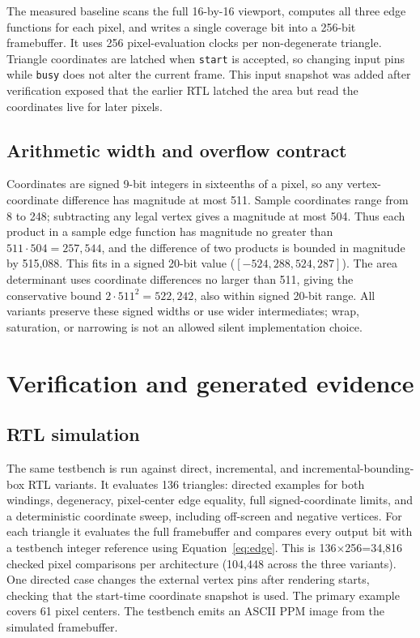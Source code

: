 \documentclass[10pt,a4paper]{article}
\begin{document}
The measured baseline scans the full 16-by-16 viewport, computes all three
edge functions for each pixel, and writes a single coverage bit into a
256-bit framebuffer. It uses 256 pixel-evaluation clocks per non-degenerate
triangle. Triangle coordinates are latched when \texttt{start} is accepted,
so changing input pins while \texttt{busy} does not alter the current frame.
This input snapshot was added after verification exposed that the earlier RTL
latched the area but read the coordinates live for later pixels.

\subsection{Arithmetic width and overflow contract}

Coordinates are signed 9-bit integers in sixteenths of a pixel, so any
vertex-coordinate difference has magnitude at most 511. Sample coordinates
range from 8 to 248; subtracting any legal vertex gives a magnitude at most
504. Thus each product in a sample edge function has magnitude no greater
than \(511\cdot504=257{,}544\), and the difference of two products is bounded
in magnitude by 515,088. This fits in a signed 20-bit value
(\([-524{,}288,524{,}287]\)). The area determinant uses coordinate
differences no larger than 511, giving the conservative bound
\(2\cdot511^2=522{,}242\), also within signed 20-bit range. All variants
preserve these signed widths or use wider intermediates; wrap,
saturation, or narrowing is not an allowed silent implementation choice.

\section{Verification and generated evidence}

\subsection{RTL simulation}

The same testbench is run against direct, incremental, and
incremental-bounding-box RTL variants. It evaluates 136 triangles: directed examples for both
windings, degeneracy, pixel-center edge equality, full signed-coordinate
limits, and a deterministic coordinate sweep, including off-screen and
negative vertices. For each triangle it evaluates the full framebuffer and
compares every output bit with a testbench integer reference using
Equation~\ref{eq:edge}. This is 136\(\times\)256=34,816 checked pixel
comparisons per architecture (104,448 across the three variants). One
directed case changes the external vertex pins after
rendering starts, checking that the start-time coordinate snapshot is used.
The primary example covers 61 pixel centers. The testbench emits an ASCII
PPM image from the simulated framebuffer.
\end{document}
